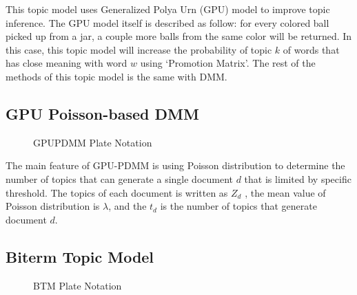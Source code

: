\documentclass[senior]{IPSstyle}
\begin{document}
This topic model uses Generalized Polya Urn (GPU) model to improve topic inference. The GPU model itself is described as follow: for every colored ball picked up from a jar, a couple more balls from the same color will be returned. In this case, this topic model will increase the probability of topic $k$ of words that has close meaning with word $w$ using ‘Promotion Matrix’. The rest of the methods of this topic model is the same with DMM.

\subsection{GPU Poisson-based DMM~\cite{li2}}

\begin{figure}[b]
	\centering
	\caption{GPUPDMM Plate Notation}
\label{fig_gpupdmm}
\end{figure}

The main feature of GPU-PDMM is using Poisson distribution to determine the number of topics that can generate a single document $d$ that is limited by specific threshold. The topics of each document is written as $Z_d$ , the mean value of Poisson distribution is $\lambda$, and the $t_d$ is the number of topics that generate document $d$.

\subsection{Biterm Topic Model~\cite{cheng}}

\begin{figure}[h]
	\centering
	\caption{BTM Plate Notation}
\label{fig_btm}
\end{figure}
\end{document}
